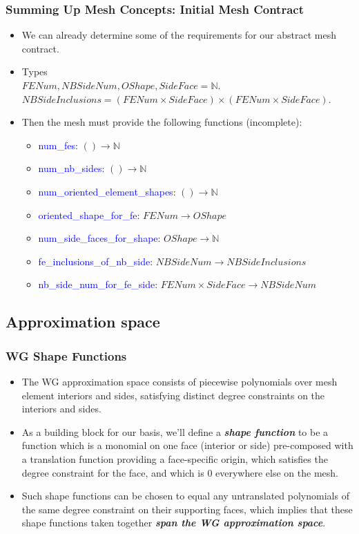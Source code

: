 \documentclass[compress]{beamer}
\begin{document}
\begin{frame}
  \frametitle{Summing Up Mesh Concepts: Initial Mesh Contract}
  \begin{itemize}[<+->]
    \item We can already determine some of the requirements for our abstract mesh contract.
    \item Types \\
      $FENum, NBSideNum, OShape, SideFace = \mathbb{N}$.\\
      $NBSideInclusions = (FENum \times SideFace) \times (FENum \times SideFace)$.
    \item Then the mesh must provide the following functions (incomplete):
      \begin{itemize}[<+->]
        \item \textcolor{blue}{num\_fes}: $() \rightarrow \mathbb{N}$
        \item \textcolor{blue}{num\_nb\_sides:} $() \rightarrow \mathbb{N}$
        \item \textcolor{blue}{num\_oriented\_element\_shapes}: $() \rightarrow \mathbb{N}$
        \item \textcolor{blue}{oriented\_shape\_for\_fe}:  $FENum \rightarrow OShape$
        \item \textcolor{blue}{num\_side\_faces\_for\_shape}: $OShape \rightarrow \mathbb{N}$
        \item \textcolor{blue}{fe\_inclusions\_of\_nb\_side}: $NBSideNum \rightarrow NBSideInclusions $
        \item \textcolor{blue}{nb\_side\_num\_for\_fe\_side}: $FENum \times SideFace \rightarrow NBSideNum$
      \end{itemize}
  \end{itemize}
\end{frame}

\subsection{Approximation space}

\begin{frame}
  \frametitle{WG Shape Functions}
  \begin{itemize}[<+->]
    \item The WG approximation space consists of piecewise polynomials over mesh element interiors and sides,
      satisfying distinct degree constraints on the interiors and sides.
    \item As a building block for our basis, we'll define a \emph{\textbf{shape function}} to be a function which is a monomial on one face
      (interior or side) pre-composed with a translation function providing a face-specific origin, which satisfies the degree constraint for
      the face, and which is 0 everywhere else on the mesh.
    \item Such shape functions can be chosen to equal any untranslated polynomials of the same degree constraint on their supporting faces,
      which implies that these shape functions taken together \emph{\textbf{span the WG approximation space}}. 
  \end{itemize}
\end{frame}
\end{document}
